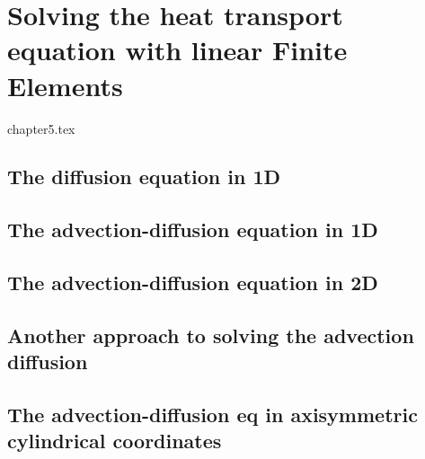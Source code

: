 \chapter{Solving the heat transport equation with linear Finite Elements \label{chapt5}} %

\begin{flushright} {\tiny {\color{gray} chapter5.tex}} \end{flushright}

\section{The diffusion equation in 1D} \label{sec:diff1D}  %
\section{The advection-diffusion equation in 1D} \label{sec:advec-diff1D} %
\section{The advection-diffusion equation in 2D} \label{ss:hte_fem} %
\section{Another approach to solving the advection diffusion}\label{ss:hte_diff} 

\section{The advection-diffusion eq in axisymmetric cylindrical coordinates}\label{ss:hte_axisym} 

